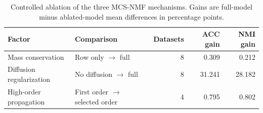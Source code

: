 \begin{table}[!htbp]
\centering
\caption{Controlled ablation of the three MCS-NMF mechanisms. Gains are full-model minus ablated-model mean differences in percentage points.}
\label{tab:controlled_ablation}
\footnotesize
\begin{tabular}{llrrr}
\toprule
Factor & Comparison & Datasets & ACC gain & NMI gain \\
\midrule
Mass conservation & Row only $\rightarrow$ full & 8 & 0.309 & 0.212 \\
Diffusion regularization & No diffusion $\rightarrow$ full & 8 & 31.241 & 28.182 \\
High-order propagation & First order $\rightarrow$ selected order & 4 & 0.795 & 0.802 \\
\bottomrule
\end{tabular}
\end{table}
